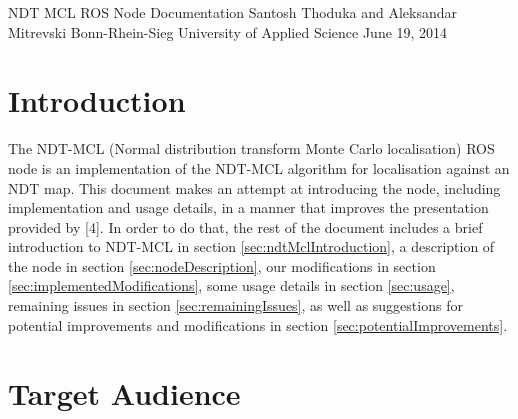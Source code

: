\documentclass[12pt]{article}
\begin{document}

	\begin{titlepage}
		\vspace*{\fill}
		\begin{center}
			\begin{spacing}{1.5}
				NDT MCL ROS Node Documentation
				\linebreak
				Santosh Thoduka and Aleksandar Mitrevski
				\linebreak
				Bonn-Rhein-Sieg University of Applied Science
				\linebreak \linebreak
				June 19, 2014
			\end{spacing}
		\end{center}
		\vspace*{\fill}
	\end{titlepage}

\setcounter{page}{2}

\newpage
	\setlength{\parindent}{0.0in}

	\renewcommand*\contentsname{\hfill Contents \hfill}
	\tableofcontents

\newpage

	\section{Introduction}
	\label{sec:introduction}

	The NDT-MCL (Normal distribution transform Monte Carlo localisation) ROS node is an implementation of the NDT-MCL algorithm for localisation against an NDT map. This document makes an attempt at introducing the node, including implementation and usage details, in a manner that improves the presentation provided by [4]. In order to do that, the rest of the document includes a brief introduction to NDT-MCL in section \ref{sec:ndtMclIntroduction}, a description of the node in section \ref{sec:nodeDescription}, our modifications in section \ref{sec:implementedModifications}, some usage details in section \ref{sec:usage}, remaining issues in section \ref{sec:remainingIssues}, as well as suggestions for potential improvements and modifications in section \ref{sec:potentialImprovements}.

	\section{Target Audience}
	\label{sec:targetAudience}
\end{document}
